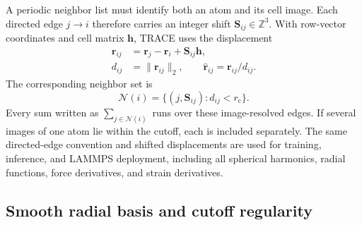 \documentclass[aps,prx,preprint,notitlepage,superscriptaddress,nofootinbib,floatfix]{revtex4-2}
\newcommand{\calN}{\mathcal{N}}
\newcommand{\vect}[1]{\bm{#1}}
\begin{document}
A periodic neighbor list must identify both an atom and its cell image. Each directed edge $j\rightarrow i$ therefore carries an integer shift $\vect S_{ij}\in\mathbb Z^3$. With row-vector coordinates and cell matrix
$\vect h$, TRACE uses the displacement
\begin{align}
 \vect r_{ij} &= \vect r_j-\vect r_i+\vect S_{ij}\vect h,\\
 d_{ij} &= \lVert\vect r_{ij}\rVert_2,\qquad
 \widehat{\vect r}_{ij}=\vect r_{ij}/d_{ij}.
 \label{eq:periodic-edge}
\end{align}
The corresponding neighbor set is
\begin{equation}
 \calN(i)=\{(j,\vect S_{ij}):d_{ij}<r_{\mathrm c}\}.
 \label{eq:neighbor-set}
\end{equation}
Every sum written as $\sum_{j\in\calN(i)}$ runs over these image-resolved edges. If several images of one atom lie within the cutoff, each is included separately. The same directed-edge convention and shifted displacements are used for training, inference, and LAMMPS deployment, including all spherical harmonics, radial functions, force derivatives, and strain derivatives.

\subsection{Smooth radial basis and cutoff regularity}
\end{document}
